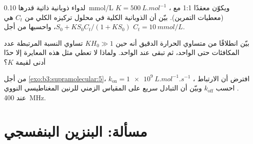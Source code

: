\begin{exercise}[$\star\star\star$]\label{exo:b3:supramolecular:10}
لدواء ذوبانية ذاتية قدرها \qty{0.10}{mmol/L} ويكوّن معقدًا 1:1 مع
، $K = \qty{500}{L.mol^{-1}}$ (معطيات التمرين). بيّن أن الذوبانية الكلية في
محلول تركيزه الكلي من  $C_t$ هي $S_0 + KS_0C_t/(1 + KS_0)$، واحسبها من أجل $C_t = \qty{10}{mmol/L}$.
\end{exercise}

\begin{exercise}[$\star\star\star$]\label{exo:b3:supramolecular:11}
بيّن انطلاقًا من متساوي الحرارة الدقيق أنه حين $KH_0 \gg 1$ تساوي النسبة المرتبطة
عدد المكافئات حتى الواحد، ثم تبقى عند الواحد. ولماذا لا تعطي مثل هذه المعايرة
إلا حدًا أدنى لقيمة $K$؟
\end{exercise}

\begin{exercise}[$\star\star\star$]\label{exo:b3:supramolecular:12}
من أجل  \cref{exo:b3:supramolecular:5}، افترض أن الارتباط
، $k_{\mathrm{on}} = \qty{1e9}{L.mol^{-1}.s^{-1}}$. احسب $k_{\mathrm{off}}$ وبيّن أن التبادل سريع على
المقياس الزمني للرنين المغناطيسي النووي عند \qty{400}{MHz}.
\end{exercise}

\section{مسألة: البنزين البنفسجي}

